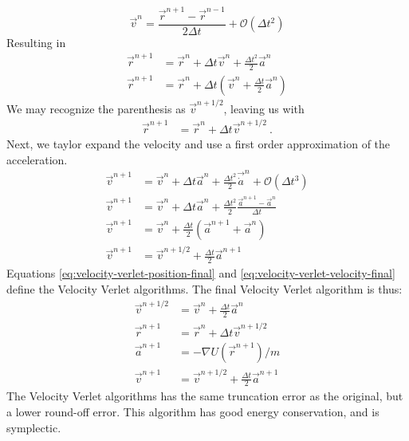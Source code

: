 \documentclass[twoside,english]{uiofysmaster}
\newcommand\lr[1]{\left(#1\right)}
\begin{document}
 \begin{equation}\label{eq:velocity-verlet-velocity}
\vec{v}^n = \frac{ \vec{r}^{n+1}-\vec{r}^{n-1} }{2\Delta t} + \mathcal{O}(\Delta t^2)
\end{equation}
Resulting in 
\begin{align}\label{eq:velocity-verlet}
	\vec{r}^{n+1} &= \vec{r}^n + \Delta t\vec{v}^n + \frac{\Delta t^2}{2}\vec{a}^n\\
	\vec{r}^{n+1} &= \vec{r}^n + \Delta t\lr{\vec{v}^n + \frac{\Delta t}{2}\vec{a}^n}	
\end{align}    
We may recognize the parenthesis as $\vec{v}^{n+1/2}$, leaving us with
\begin{align}
\vec{r}^{n+1} &= \vec{r}^n + \Delta t \vec{v}^{n+1/2}~. \label{eq:velocity-verlet-position-final}
\end{align}  
Next, we taylor expand the velocity and use a first order approximation of the acceleration.
\begin{align}
\vec{v}^{n+1} &= \vec{v}^n + \Delta t \vec{a}^{n} +  \frac{\Delta t^2}{2}\vec{\dot{a}}^n + \mathcal{O}(\Delta t^3)\\
\vec{v}^{n+1} &= \vec{v}^n + \Delta t \vec{a}^{n} +  \frac{\Delta t^2}{2}\frac{\vec{a}^{n+1} - \vec{a}^n}{\Delta t} \\
\vec{v}^{n+1} &= \vec{v}^n + \frac{\Delta t}{2} \lr{\vec{a}^{n+1} + \vec{a}^n} \\
\vec{v}^{n+1} &= \vec{v}^{n+1/2} + \frac{\Delta t}{2} \vec{a}^{n+1} \label{eq:velocity-verlet-velocity-final}
\end{align}
Equations \eqref{eq:velocity-verlet-position-final} and \eqref{eq:velocity-verlet-velocity-final} define the Velocity Verlet algorithms. 
The final Velocity Verlet algorithm is thus:
\savebox{}
\begin{align}
\vec{v}^{n+1/2}	 &= \vec{v}^{n} +  \frac{\Delta t}{2}\vec{a}^n\\
\vec{r}^{n+1} &= \vec{r}^n + \Delta t \vec{v}^{n+1/2}	\\
\vec{a}^{n+1} &= -\nabla U(\vec{r}^{n+1})/m\\
\vec{v}^{n+1} &= \vec{v}^{n+1/2} + \frac{\Delta t}{2} \vec{a}^{n+1}
\end{align}
The Velocity Verlet algorithms has the same truncation error as the original, but a lower round-off error. 
This algorithm has good energy conservation, and is symplectic.
\end{document}
